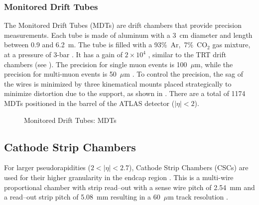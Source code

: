 \subsubsection{Monitored Drift Tubes}

The Monitored Drift Tubes (MDTs) are drift chambers that provide precision measurements. Each tube is made of aluminum with a 3~cm diameter and length between 0.9 and 6.2~m.  
The tube is filled with a 93\%~Ar,~7\%~CO$_2$ gas mixture, at a pressure of 3-bar \cite{ATLAS_long}.  It has a gain of $2\times10^4$ \cite{ATLAS_long}, similar to the TRT drift chambers (see ). The precision for single muon events is 100~$\mu$m, while the precision for multi-muon events is 50~$\mu$m \cite{ATLAS_long}. To control the precision, the sag of the wires is minimized by three kinematical mounts placed strategically to minimize distortion due to the support, as shown in . There are a total of 1174 MDTs positioned in the barrel of the ATLAS detector ($|\eta| < 2$).

\begin{figure}[h!tbp]
	\centering
\caption{Monitored Drift Tubes: MDTs}
\end{figure}

\subsection{Cathode Strip Chambers}
\label{cdc}
For larger pseudorapidities ($2 < |\eta| < 2.7$), Cathode Strip Chambers (CSCs) are used for their higher granularity in the endcap region \cite{ATLAS_long}.  This is a multi-wire proportional chamber with strip read--out with a sense wire pitch of 2.54~mm and a read--out strip pitch of 5.08~mm resulting in a 60~$\mu$m track resolution \cite{ATLAS_long}.  
